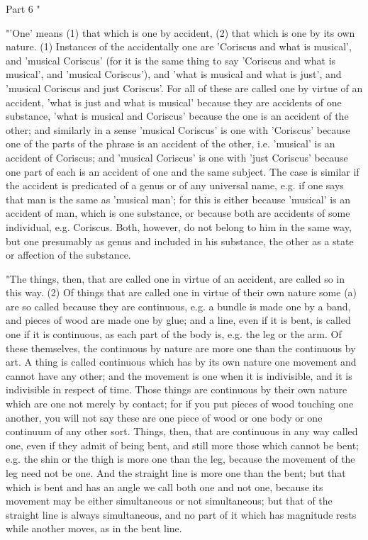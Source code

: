 Part 6 "

"'One' means (1) that which is one by accident, (2) that which is
one by its own nature. (1) Instances of the accidentally one are 'Coriscus
and what is musical', and 'musical Coriscus' (for it is the same thing
to say 'Coriscus and what is musical', and 'musical Coriscus'), and
'what is musical and what is just', and 'musical Coriscus and just
Coriscus'. For all of these are called one by virtue of an accident,
'what is just and what is musical' because they are accidents of one
substance, 'what is musical and Coriscus' because the one is an accident
of the other; and similarly in a sense 'musical Coriscus' is one with
'Coriscus' because one of the parts of the phrase is an accident of
the other, i.e. 'musical' is an accident of Coriscus; and 'musical
Coriscus' is one with 'just Coriscus' because one part of each is
an accident of one and the same subject. The case is similar if the
accident is predicated of a genus or of any universal name, e.g. if
one says that man is the same as 'musical man'; for this is either
because 'musical' is an accident of man, which is one substance, or
because both are accidents of some individual, e.g. Coriscus. Both,
however, do not belong to him in the same way, but one presumably
as genus and included in his substance, the other as a state or affection
of the substance. 

"The things, then, that are called one in virtue of an accident, are
called so in this way. (2) Of things that are called one in virtue
of their own nature some (a) are so called because they are continuous,
e.g. a bundle is made one by a band, and pieces of wood are made one
by glue; and a line, even if it is bent, is called one if it is continuous,
as each part of the body is, e.g. the leg or the arm. Of these themselves,
the continuous by nature are more one than the continuous by art.
A thing is called continuous which has by its own nature one movement
and cannot have any other; and the movement is one when it is indivisible,
and it is indivisible in respect of time. Those things are continuous
by their own nature which are one not merely by contact; for if you
put pieces of wood touching one another, you will not say these are
one piece of wood or one body or one continuum of any other sort.
Things, then, that are continuous in any way called one, even if they
admit of being bent, and still more those which cannot be bent; e.g.
the shin or the thigh is more one than the leg, because the movement
of the leg need not be one. And the straight line is more one than
the bent; but that which is bent and has an angle we call both one
and not one, because its movement may be either simultaneous or not
simultaneous; but that of the straight line is always simultaneous,
and no part of it which has magnitude rests while another moves, as
in the bent line. 


